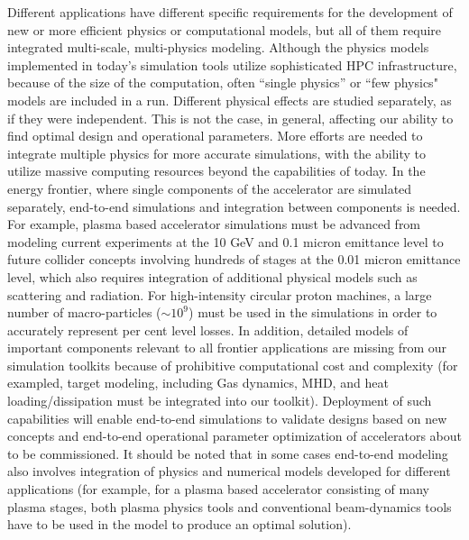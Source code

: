  Different applications have different specific
requirements for the development of new or more efficient physics
or computational models, but all of them require integrated
multi-scale, multi-physics modeling.  
Although the physics models implemented in today's simulation tools utilize sophisticated HPC infrastructure, because of the size of the computation, often ``single physics'' or ``few physics" models are included in a run. Different physical effects are studied separately, as if they were independent.  This is not the case, in general, affecting our ability to find optimal design and operational parameters.  More efforts are needed to integrate multiple physics for more accurate simulations, with the ability to utilize massive computing resources beyond the capabilities of today. 
   In the energy frontier, where single components of the accelerator are simulated separately, end-to-end simulations and integration between components is needed.  For example, plasma based accelerator simulations must be advanced from modeling current experiments at the 10 GeV and 0.1 micron emittance level to future collider concepts involving hundreds of stages at the 0.01 micron emittance level, which also requires integration of additional physical models such as scattering and radiation. For high-intensity circular proton machines, a large number of macro-particles ($\sim 10^9$) must be used in the simulations in order to accurately represent per cent level losses. In addition, detailed models of important components relevant to all frontier applications are missing from our simulation toolkits because of prohibitive computational cost and complexity (for exampled, target modeling, including Gas dynamics, MHD, and heat loading/dissipation must be integrated into our toolkit). 
Deployment of such capabilities
will enable end-to-end simulations to validate designs based on
new concepts and end-to-end operational parameter optimization of
accelerators about to be commissioned.  It should be noted that
in some cases end-to-end modeling also involves integration of physics
and numerical models developed for different applications (for
example, for a plasma based accelerator consisting of many plasma
stages, both plasma physics tools and conventional beam-dynamics
tools have to be used in the model to produce an optimal
solution).

